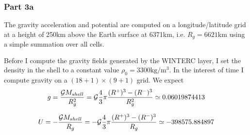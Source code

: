 \subsubsection*{Part 3a}

The gravity acceleration and potential are computed on a longitude/latitude 
grid at a height of 250km above the Earth surface at 6371km, i.e. $R_g=6621\si{\kilo\metre}$ using a 
simple summation over all cells.

Before I compute the gravity fields generated by the WINTERC layer, 
I set the density in the shell to a constant value $\rho_0=3300\si{\kilo\gram\per\cubic\metre}$.
In the interest of time I compute gravity on a $(18+1)\times(9+1)$ grid.
We expect 
\[
g=\frac{{\cal G} M_{shell}}{R_g^2}= 
{\cal G} \frac{4}{3}\pi \frac{(R^+)^3-(R^-)^3}{R_g^2}
\simeq 0.06019874413
\]

\[
U=-\frac{{\cal G} M_{shell}}{R_g}
=- {\cal G} \frac{4}{3}\pi \frac{(R^+)^3-(R^-)^3}{R_g}
\simeq -398575.884897
\]


